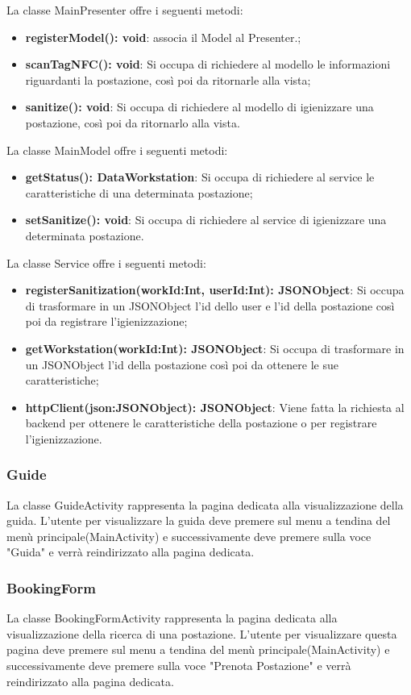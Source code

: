 La classe MainPresenter offre i seguenti metodi:
\begin{itemize}
	\item \textbf{registerModel(): void}: associa il Model al Presenter.; 
	\item \textbf{scanTagNFC(): void}: Si occupa di richiedere al modello le informazioni riguardanti la postazione, così poi da ritornarle alla vista; 
	\item \textbf{sanitize(): void}: Si occupa di richiedere al modello di igienizzare una postazione, così poi da ritornarlo alla vista. 
\end{itemize}

La classe MainModel offre i seguenti metodi:
\begin{itemize}
	\item \textbf{getStatus(): DataWorkstation}: Si occupa di richiedere al service le caratteristiche di una determinata postazione;
	\item \textbf{setSanitize(): void}: Si occupa di richiedere al service di igienizzare una determinata postazione.
\end{itemize}

La classe Service offre i seguenti metodi:
\begin{itemize}
	\item \textbf{registerSanitization(workId:Int, userId:Int): JSONObject}: Si occupa di trasformare in un JSONObject l'id dello user e l'id della postazione così poi da registrare l'igienizzazione;
	\item \textbf{getWorkstation(workId:Int): JSONObject}: Si occupa di trasformare in un JSONObject l'id della postazione così poi da ottenere le sue caratteristiche;
	\item \textbf{httpClient(json:JSONObject): JSONObject}: Viene fatta la richiesta al backend per ottenere le caratteristiche della postazione o per registrare l'igienizzazione.	
\end{itemize}

\subsubsection{Guide}
La classe GuideActivity rappresenta la pagina dedicata alla visualizzazione della guida.
L'utente per visualizzare la guida deve premere sul menu a tendina del menù principale(MainActivity) e successivamente deve premere sulla voce "Guida" e verrà reindirizzato alla pagina dedicata.

\subsubsection{BookingForm}
La classe BookingFormActivity rappresenta la pagina dedicata alla visualizzazione della ricerca di una postazione.
L'utente per visualizzare questa pagina deve premere sul menu a tendina del menù principale(MainActivity) e successivamente deve premere sulla voce "Prenota Postazione" e verrà reindirizzato alla pagina dedicata.


